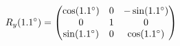 \documentclass[preview]{standalone}
\begin{document}
\begin{align*}
\special{dvisvgm:raw <g id='unique000'>}R_y(1.1^\circ) = \begin{pmatrix} \cos(1.1^\circ) & 0 & -\sin(1.1^\circ) \\ 0 & 1 & 0 \\ \sin(1.1^\circ) & 0 & \cos(1.1^\circ) \end{pmatrix}\special{dvisvgm:raw </g>}
\end{align*}
\end{document}
